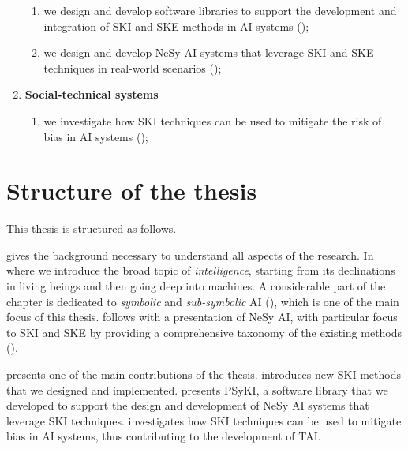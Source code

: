 \begin{refsection}
\begin{enumerate}[label=\emph{(\roman*)}]
    \begin{enumerate}[label=\emph{(\arabic*)},resume]
        \item we design and develop software libraries to support the development and integration of \gls{SKI} and \gls{SKE} methods in \gls{AI} systems ();
        \item we design and develop \gls{NeSy} \gls{AI} systems that leverage \gls{SKI} and \gls{SKE} techniques in real-world scenarios ();
    \end{enumerate}
    \item \textbf{Social-technical systems}

    \begin{enumerate}[label=\emph{(\arabic*)},resume]
        \item we investigate how \gls{SKI} techniques can be used to mitigate the risk of bias in \gls{AI} systems ();
    \end{enumerate}
\end{enumerate}


\section{Structure of the thesis}
\label{sec:structure-of-the-thesis}
%
This thesis is structured as follows.

 gives the background necessary to understand all aspects of the research.
%
In  where we introduce the broad topic of \emph{intelligence}, starting from its declinations in living beings and then going deep into machines.
%
A considerable part of the chapter is dedicated to \emph{symbolic} and \emph{sub-symbolic} \gls{AI} (), which is one of the main focus of this thesis.
%
 follows with a presentation of \gls{NeSy} \gls{AI}, with particular focus to \gls{SKI} and \gls{SKE} by providing a comprehensive taxonomy of the existing methods ().


 presents one of the main contributions of the thesis.
%
 introduces new \gls{SKI} methods that we designed and implemented.
%
 presents \gls{PSyKI}, a software library that we developed to support the design and development of \gls{NeSy} \gls{AI} systems that leverage \gls{SKI} techniques.
%
 investigates how \gls{SKI} techniques can be used to mitigate bias in \gls{AI} systems, thus contributing to the development of \gls{TAI}.



\end{refsection}
